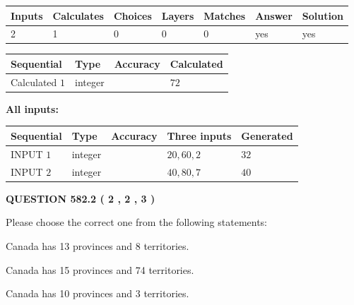 \documentclass[12pt]{article}
\begin{document}
   
\noindent\begin{tabular}{|l|l|l|l|l|l|l|}
 \hline
Inputs & Calculates & Choices & Layers & Matches & Answer & Solution \\ \hline
 2  & 
 1  & 
 0
  & 
 0  & 
 0  & 
  yes & 
  yes 
  \\ \hline
 \end{tabular}
   
   
   
   
\noindent{}
   
   
  
  
\noindent\begin{tabular}{|l|l|l|l|}
\hline
 Sequential & Type & Accuracy & Calculated \\ 
\hline
 
 
  Calculated $  1 $ & integer &  & 
  $ 72 $ 
 \\  \hline  
 \end{tabular}
   
   
   
   
\noindent\vspace{0.1in}\hspace{-0.08in} {\textbf{\Large{All inputs: }}}
   
   
  
  
\noindent\begin{tabular}{|l|l|l|l|l|}
\hline
 Sequential & Type & Accuracy & Three inputs & Generated \\ 
\hline
 
 
  INPUT $  1 $ & integer &  & $
 20
 , 
 60
 , 
 2
 $ & $ 32 $ 
 \\  \hline  
 
 
  INPUT $  2 $ & integer &  & $
 40
 , 
 80
 , 
 7
 $ & $ 40 $ 
 \\  \hline  
 \end{tabular}
   
   
  
\vspace{0.2in}
  
{\textbf{\Large{QUESTION
582.2 
 ( 2 , 2 , 3 )
}}}
  
  
Please choose the correct one from the following statements:
 
 
Canada has  13 provinces and  8 territories.
 
 
Canada has  15 provinces and  74 territories.
 
 
Canada has 10  provinces and 3 territories.
 
\end{document}
